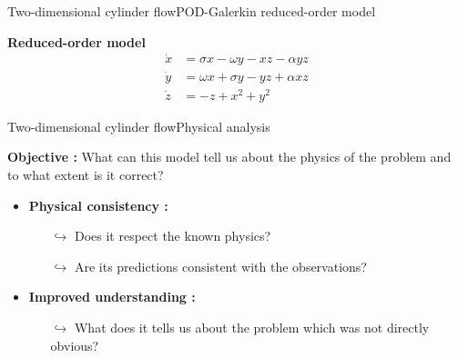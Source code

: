 \documentclass[usenames,dvipsnames,svgnames,10pt,aspectratio=169]{beamer}
\begin{document}
\begin{frame}[t, c]{Two-dimensional cylinder flow}{POD-Galerkin reduced-order model}
  \centering
  \begin{tcolorbox}[colback=white, colframe=beamer@kthblue]
    \centering
    \textbf{Reduced-order model}
    \[
    \begin{aligned}
      \dot{x} & = \sigma x - \omega y - xz - \alpha yz \\
      \dot{y} & = \omega x + \sigma y - yz + \alpha xz \\
      \dot{z} & = -z + x^2 + y^2
    \end{aligned}
    \]
  \end{tcolorbox}
\end{frame}



\begin{frame}[t, c]{Two-dimensional cylinder flow}{Physical analysis}
  \begin{minipage}{.68\textwidth}
    \begin{tcolorbox}[colback=white, colframe=beamer@kthblue]
      \textbf{Objective :} What can this model tell us about the physics of the problem and to what extent is it correct?
    \end{tcolorbox}

    \bigskip

    \begin{itemize}
    \item \textbf{Physical consistency :}
      \begin{itemize}
      \item[$\hookrightarrow$] Does it respect the known physics?
      \item[$\hookrightarrow$] Are its predictions consistent with the observations?
      \end{itemize}

      \medskip

    \item \textbf{Improved understanding :}
      \begin{itemize}
      \item[$\hookrightarrow$] What does it tells us about the problem which was not directly obvious?


\end{itemize}
\end{itemize}
\end{minipage}
\end{frame}
\end{document}
